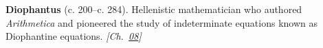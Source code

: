 \textbf{Diophantus} (c. 200–c. 284). Hellenistic mathematician who authored \emph{Arithmetica} and pioneered the study of indeterminate equations known as Diophantine equations. \emph{[Ch.~\hyperref[ch:boundedprimegaps]{08}]}

